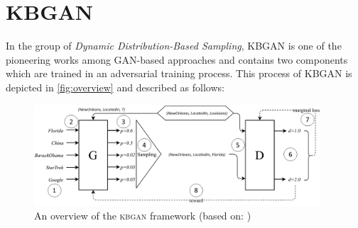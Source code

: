 \section{KBGAN} \label{sec:kbgan}
In the group of \textit{Dynamic Distribution-Based Sampling}, \ac{KBGAN} is one of the pioneering works among \ac{GAN}-based approaches and contains two components which are trained in an adversarial training process.
This process of \ac{KBGAN} is depicted in \autoref{fig:overview} and described as follows:
\begin{figure}[t]
  \centering
    \includegraphics[width=0.95\textwidth]{figures/kbgan_original.png}
  \caption{An overview of the \textsc{kbgan} framework (based on: \cite{cai2017kbgan})}
  \label{fig:overview}
\end{figure}

